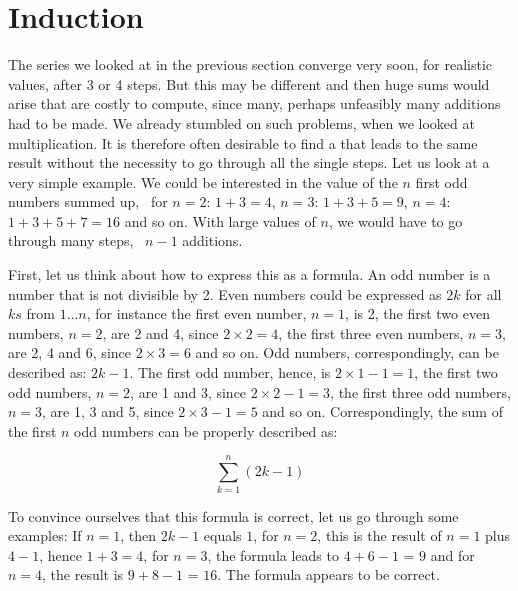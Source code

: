 \documentclass{scrreprt}
\newcommand{\Conid}[1]{\mathit{#1}}
\def\resethooks{%
  \global\let\SaveRestoreHook\empty
  \global\let\ColumnHook\empty}
\let\hspre\empty
\let\hspost\empty
\begin{document}
\section{Induction}
\ignore{
\begingroup\par\noindent\advance\leftskip\mathindent\(
\begin{pboxed}\SaveRestoreHook
\column{B}{@{}>{\hspre}l<{\hspost}@{}}%
\column{3}{@{}>{\hspre}l<{\hspost}@{}}%
\column{E}{@{}>{\hspre}l<{\hspost}@{}}%
\>[3]{}\mathbf{import}\;\Conid{Natural}{}\<[E]%
\ColumnHook
\end{pboxed}
\)\par\noindent\endgroup\resethooks
}
The series we looked at in the previous section
converge very soon,
for realistic values,
after 3 or 4 steps.
But this may be different and
then huge sums would arise that are costly to compute,
since many, perhaps unfeasibly many additions
had to be made. We already stumbled on such problems,
when we looked at multiplication.
It is therefore often desirable to find a 
that leads to the same result without the necessity
to go through all the single steps. %
Let us look at a very simple example.
We could be interested in the value 
of the $n$ first odd numbers summed up,
\ie\ for $n = 2$: $1 + 3 = 4$,
         $n = 3$: $1 + 3 + 5 = 9$,
         $n = 4$: $1 + 3 + 5 + 7 = 16$
and so on.
With large values of $n$, 
we would have to go through many steps, 
\viz\ $n - 1$ additions.

First, let us think about how to express this as a formula.
An odd number is a number that is not divisible by 2.
Even numbers could be expressed as $2k$
for all $ks$ from $1 \dots n$, for instance
the first even number, $n = 1$, is 2,
the first two even numbers, $n = 2$, are 2 and 4,
since $2 \times 2 = 4$,
the first three even numbers, $n = 3$, are 2, 4 and 6,
since $2 \times 3 = 6$ 
and so on.
Odd numbers, correspondingly, can be described as:
$2k - 1$.
The first odd number, hence, is $2 \times 1 - 1 = 1$,
the first two odd numbers, $n=2$, are 1 and 3,
since $2 \times 2 - 1 = 3$,
the first three odd numbers, $n=3$, are 1, 3 and 5,
since $2 \times 3 - 1 = 5$ and so on.
Correspondingly, the sum of the first $n$ odd numbers
can be properly described as:

\[ 
\sum_{k=1}^{n}{(2k - 1)}
\] 

To convince ourselves that this formula is correct,
let us go through some examples:
If $n=1$, then $2k - 1$ equals $1$,
for $n=2$, this is the result of $n = 1$
plus $4 - 1$, hence $1 + 3 = 4$,
for $n=3$, the formula leads to $4 + 6 - 1$ = $9$
and for $n=4$, the result is $9 + 8 - 1$ = $16$.
The formula appears to be correct.
\end{document}
